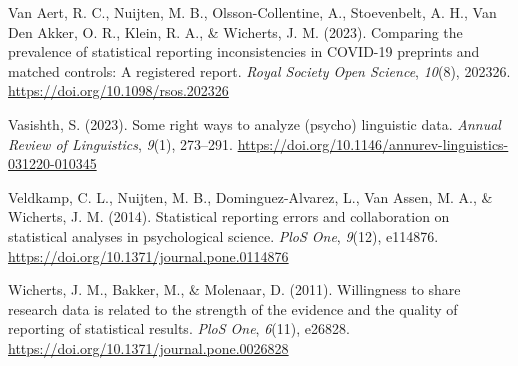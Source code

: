 \documentclass[
  doc,
  longtable,
  nolmodern,
  notxfonts,
  notimes,
  colorlinks=true,linkcolor=blue,citecolor=blue,urlcolor=blue]{apa7}
\newlength{\cslhangindent}
\newenvironment{CSLReferences}[2] %
 {\begin{list}{}{%
  \setlength{\itemindent}{0pt}
  \setlength{\leftmargin}{0pt}
  \setlength{\parsep}{0pt}
  \ifodd #1
   \setlength{\leftmargin}{\cslhangindent}
   \setlength{\itemindent}{-1\cslhangindent}
  \fi
  \setlength{\itemsep}{#2\baselineskip}}}
 {\end{list}}
\begin{document}
\begin{CSLReferences}{1}{0}
Van Aert, R. C., Nuijten, M. B., Olsson-Collentine, A., Stoevenbelt, A.
H., Van Den Akker, O. R., Klein, R. A., \& Wicherts, J. M. (2023).
Comparing the prevalence of statistical reporting inconsistencies in
COVID-19 preprints and matched controls: A registered report.
\emph{Royal Society Open Science}, \emph{10}(8), 202326.
\url{https://doi.org/10.1098/rsos.202326}

Vasishth, S. (2023). Some right ways to analyze (psycho) linguistic
data. \emph{Annual Review of Linguistics}, \emph{9}(1), 273--291.
\url{https://doi.org/10.1146/annurev-linguistics-031220-010345}

Veldkamp, C. L., Nuijten, M. B., Dominguez-Alvarez, L., Van Assen, M.
A., \& Wicherts, J. M. (2014). Statistical reporting errors and
collaboration on statistical analyses in psychological science.
\emph{PloS One}, \emph{9}(12), e114876.
\url{https://doi.org/10.1371/journal.pone.0114876}

Wicherts, J. M., Bakker, M., \& Molenaar, D. (2011). Willingness to
share research data is related to the strength of the evidence and the
quality of reporting of statistical results. \emph{PloS One},
\emph{6}(11), e26828. \url{https://doi.org/10.1371/journal.pone.0026828}

\end{CSLReferences}
\end{document}
